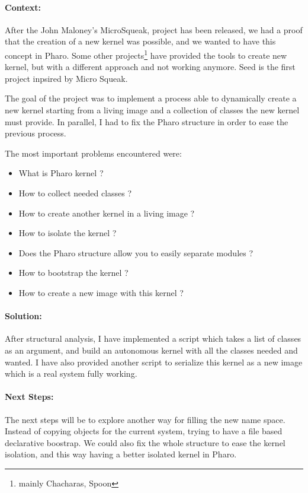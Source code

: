 \paragraph{Context:} After the John Maloney's MicroSqueak, project has been released, we had a proof that the creation of a new kernel was possible, and we wanted to have this concept in \gls{Pharo}. Some other projects\footnote{mainly Chacharas, Spoon } have provided the tools to create new kernel, but with a different approach and not working anymore. Seed is the first project inpsired by \gls{Micro Squeak}.

\goal The goal of the project was to implement a process able to dynamically create a new kernel starting from a living image and a collection of classes the new kernel must provide. In parallel, I had to fix the \gls{Pharo} structure in order to ease the previous process. 

\problems The most important problems encountered were:
	\begin{itemize}
		\item What is \gls{Pharo} kernel ?
		\item How to collect needed classes ?
		\item How to create another kernel in a living image ?
		\item How to isolate the kernel ?
		\item Does the \gls{Pharo} structure allow you to easily separate modules ?
		\item How to bootstrap the kernel ?
		\item How to create a new image with this kernel ?
	\end{itemize}

\paragraph{Solution:} After structural analysis, I have implemented a script which takes a list of classes as an argument, and build an autonomous kernel with all the classes needed and wanted. I have also provided another script to serialize this kernel as a new image which is a real system fully working.
\paragraph{Next Steps:}
The next steps will be to explore another way for filling the new name space. Instead of copying objects for the current system, trying to have a file based declarative boostrap. We could also fix the whole structure to ease the kernel isolation, and this way having a better isolated kernel in \gls{Pharo}.

